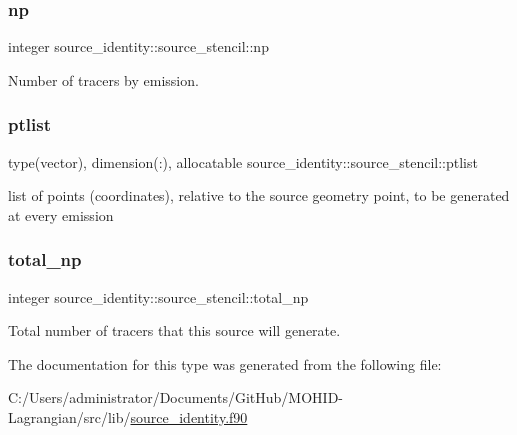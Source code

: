 \subsubsection{\texorpdfstring{np}{np}}
{\footnotesize\ttfamily integer source\+\_\+identity\+::source\+\_\+stencil\+::np\hspace{0.3cm}{\ttfamily [private]}}



Number of tracers by emission. 

\mbox{\label{structsource__identity_1_1source__stencil_a91822da10e869f72071fa29e2bb2c080}} 
\subsubsection{\texorpdfstring{ptlist}{ptlist}}
{\footnotesize\ttfamily type(vector), dimension(\+:), allocatable source\+\_\+identity\+::source\+\_\+stencil\+::ptlist\hspace{0.3cm}{\ttfamily [private]}}



list of points (coordinates), relative to the source geometry point, to be generated at every emission 

\mbox{\label{structsource__identity_1_1source__stencil_a11f7462457253157db252466b51000f2}} 
\subsubsection{\texorpdfstring{total\+\_\+np}{total\_np}}
{\footnotesize\ttfamily integer source\+\_\+identity\+::source\+\_\+stencil\+::total\+\_\+np\hspace{0.3cm}{\ttfamily [private]}}



Total number of tracers that this source will generate. 



The documentation for this type was generated from the following file\+:\begin{DoxyCompactItemize}
\item 
C\+:/\+Users/administrator/\+Documents/\+Git\+Hub/\+M\+O\+H\+I\+D-\/\+Lagrangian/src/lib/\hyperlink{source__identity_8f90}{source\+\_\+identity.\+f90}\end{DoxyCompactItemize}
